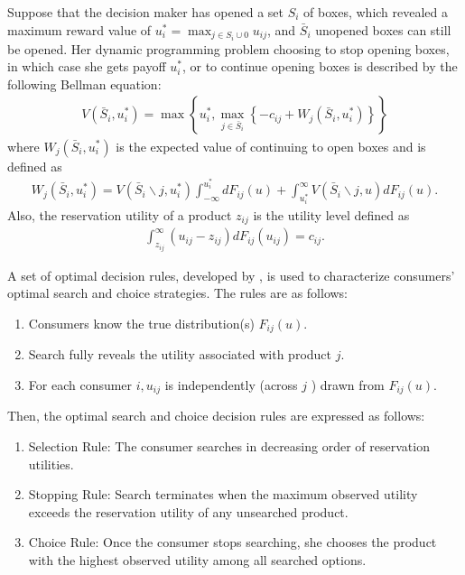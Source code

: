\documentclass[12pt]{article}
\begin{document}
Suppose that the decision maker has opened a set \(S_{i}\) of boxes,
which revealed a maximum reward value of \(u_{i}^{*}=\max _{j \in S_{i} \cup 0} u_{i j}\), and \(\bar{S}_{i}\) unopened boxes can still be
opened. 
Her dynamic programming problem choosing to stop opening boxes, in which case she
gets payoff \(u_{i}^{*}\), or to continue opening boxes is described
by the following Bellman equation:
\begin{align}
    V\left(\bar{S}_{i}, u_{i}^{*}\right)=\max \left\{u_{i}^{*}, \max _{j \in \bar{S}_{i}}\left\{-c_{i j}+W_{j}\left(\bar{S}_{i}, u_{i}^{*}\right)\right\}\right\}
\end{align}
where \(W_{j}\left(\bar{S}_{i}, u_{i}^{*}\right)\) is the expected value of continuing to open boxes and is
defined as
\begin{align}
    W_{j}\left(\bar{S}_{i}, u_{i}^{*}\right)=V\left(\bar{S}_{i} \backslash j, u_{i}^{*}\right) \int_{-\infty}^{u_{i}^{*}} d F_{i j}(u)+\int_{u_{i}^{*}}^{\infty} V\left(\bar{S}_{i} \backslash j, u\right) d F_{i j}(u).
\end{align}
Also, the reservation utility of a product \(z_{i j}\) is the utility level defined as 
\begin{align}
    \int_{z_{i j}}^{\infty}\left(u_{i j}-z_{i j}\right) d F_{i j}\left(u_{i j}\right)=c_{i j}.
\end{align}

A set of optimal decision rules, developed by
\cite{weitzman1979optimal}, is used to characterize consumers' optimal search and choice strategies. 
The rules are as follows:
\begin{enumerate}
    \item Consumers know the true distribution(s) \(F_{i j}(u)\).
    \item Search fully reveals the utility associated with product \(j\).
    \item For each consumer \(i, u_{i j}\) is independently (across \(j\) ) drawn from \(F_{i j}(u)\).
\end{enumerate}
Then, the optimal search and choice decision
rules are expressed as follows:
\begin{enumerate}
    \item Selection Rule: The consumer searches in decreasing order of reservation utilities.
    \item Stopping Rule: Search terminates when the maximum observed utility exceeds the reservation utility of any unsearched product.
    \item Choice Rule: Once the consumer stops searching, she chooses the product with the highest observed utility among all searched options.
\end{enumerate}
\end{document}
